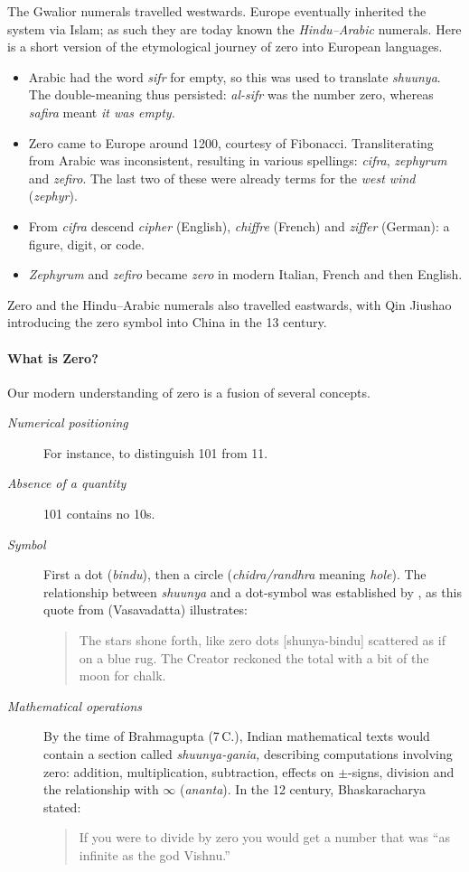 The Gwalior numerals travelled westwards. Europe eventually inherited the system via Islam; as such they are today known the \emph{Hindu--Arabic} numerals. Here is a short version of the etymological journey of zero into European languages.
\begin{itemize}
  \item Arabic had the word \emph{sifr} for empty, so this was used to translate \emph{shuunya}. The double-meaning thus persisted: \emph{al-sifr} was the number zero, whereas \emph{safira} meant \emph{it was empty.}
  \item Zero came to Europe around 1200, courtesy of Fibonacci. Transliterating from Arabic was inconsistent, resulting in various spellings: \emph{cifra}, \emph{zephyrum} and \emph{zefiro}. The last two of these were already terms for the \emph{west wind} (\emph{zephyr}).
  \item From \emph{cifra} descend \emph{cipher} (English), \emph{chiffre} (French) and \emph{ziffer} (German): a figure, digit, or code.
  \item \emph{Zephyrum} and \emph{zefiro} became \emph{zero} in modern Italian, French and then English.
\end{itemize}
Zero and the Hindu--Arabic numerals also travelled eastwards, with Qin Jiushao introducing the zero symbol into China in the 13\th{} century.


\paragraph{What is Zero?}

Our modern understanding of zero is a fusion of several concepts.
\begin{description}
	\item[\normalfont\emph{Numerical positioning}] For instance, to distinguish 101 from 11.
	\item[\normalfont\emph{Absence of a quantity}] 101 contains no 10s.
	\item[\normalfont\emph{Symbol}] First a dot (\emph{bindu}), then a circle (\emph{chidra/randhra} meaning \emph{hole}). The relationship between \emph{shuunya} and a dot-symbol was established by , as this quote from  (Vasavadatta) illustrates:
	\begin{quote}
		The stars shone forth, like zero dots [shunya-bindu] scattered as if on a blue rug. The Creator reckoned the total with a bit of the moon for chalk.
	\end{quote}
	\item[\normalfont\emph{Mathematical operations}] By the time of Brahmagupta (7\th\,C.), Indian mathematical texts would contain a section called \emph{shuunya-gania,} describing computations involving zero: addition, multiplication, subtraction, effects on $\pm$-signs, division and the relationship with $\infty$ (\emph{ananta}). In the 12\th{} century, Bhaskaracharya stated:
	\begin{quote}
		If you were to divide by zero you would get a number that was ``as infinite as the god Vishnu.''
	\end{quote}
\end{description}


